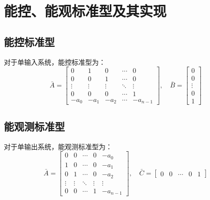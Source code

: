 \section{能控、能观标准型及其实现}

\subsection{能控标准型}
对于单输入系统，能控标准型为：
\[\bar{A} = \begin{bmatrix}
0 & 1 & 0 & \cdots & 0 \\
0 & 0 & 1 & \cdots & 0 \\
\vdots & \vdots & \vdots & \ddots & \vdots \\
0 & 0 & 0 & \cdots & 1 \\
-a_0 & -a_1 & -a_2 & \cdots & -a_{n-1}
\end{bmatrix}, \quad \bar{B} = \begin{bmatrix} 0 \\ 0 \\ \vdots \\ 0 \\ 1 \end{bmatrix}\]

\subsection{能观测标准型}
对于单输出系统，能观测标准型为：
\[\bar{A} = \begin{bmatrix}
0 & 0 & \cdots & 0 & -a_0 \\
1 & 0 & \cdots & 0 & -a_1 \\
0 & 1 & \cdots & 0 & -a_2 \\
\vdots & \vdots & \ddots & \vdots & \vdots \\
0 & 0 & \cdots & 1 & -a_{n-1}
\end{bmatrix}, \quad \bar{C} = \begin{bmatrix} 0 & 0 & \cdots & 0 & 1 \end{bmatrix}\]
